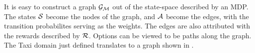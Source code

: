 It is easy to construct a graph $\mathcal{G}_{\mathcal{M}}$ out of the state-space
described by an MDP. The states $\mathcal{S}$ become the nodes of the
graph, and $\mathcal{A}$ become the edges, with the transition
probabilites serving as the weights. The edges are also attributed
with the rewards described by $\mathcal{R}$. Options can be viewed to be
paths along the graph. The Taxi domain just defined translates to a
graph shown in .

